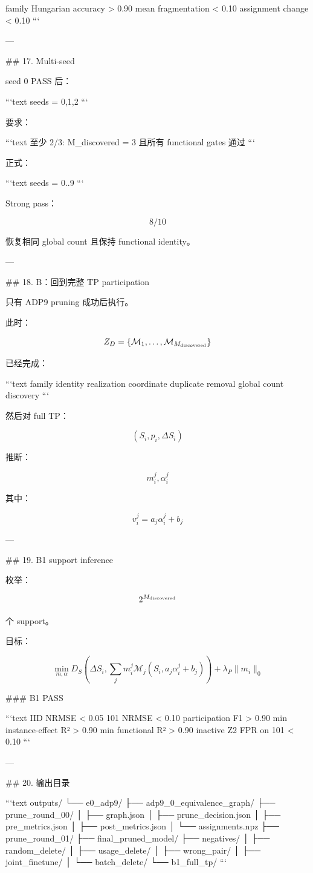 family Hungarian accuracy > 0.90
mean fragmentation < 0.10
assignment change < 0.10
```

---

## 17. Multi-seed

seed 0 PASS 后：

```text
seeds = 0,1,2
```

要求：

```text
至少 2/3:
M_discovered = 3
且所有 functional gates 通过
```

正式：

```text
seeds = 0..9
```

Strong pass：

\[
\boxed{8/10}
\]

恢复相同 global count 且保持 functional identity。

---

## 18. B：回到完整 TP participation

只有 ADP9 pruning 成功后执行。

此时：

\[
Z_D
=
\{\mathcal M_1,\ldots,\mathcal M_{M_{\rm discovered}}\}
\]

已经完成：

```text
family identity
realization coordinate
duplicate removal
global count discovery
```

然后对 full TP：

\[
(S_i,p_i,\Delta S_i)
\]

推断：

\[
m_i^j,\alpha_i^j
\]

其中：

\[
v_i^j=a_j\alpha_i^j+b_j
\]

---

## 19. B1 support inference

枚举：

\[
2^{M_{\rm discovered}}
\]

个 support。

目标：

\[
\min_{m,\alpha}
D_S
\left(
\Delta S_i,
\sum_j
m_i^j
\mathcal M_j
\left(
S_i,
a_j\alpha_i^j+b_j
\right)
\right)
+
\lambda_P\|m_i\|_0
\]

### B1 PASS

```text
IID NRMSE < 0.05
101 NRMSE < 0.10
participation F1 > 0.90
min instance-effect R² > 0.90
min functional R² > 0.90
inactive Z2 FPR on 101 < 0.10
```

---

## 20. 输出目录

```text
outputs/
└── e0_adp9/
    ├── adp9_0_equivalence_graph/
    ├── prune_round_00/
    │   ├── graph.json
    │   ├── prune_decision.json
    │   ├── pre_metrics.json
    │   ├── post_metrics.json
    │   └── assignments.npz
    ├── prune_round_01/
    ├── final_pruned_model/
    ├── negatives/
    │   ├── random_delete/
    │   ├── usage_delete/
    │   ├── wrong_pair/
    │   ├── joint_finetune/
    │   └── batch_delete/
    └── b1_full_tp/
```

